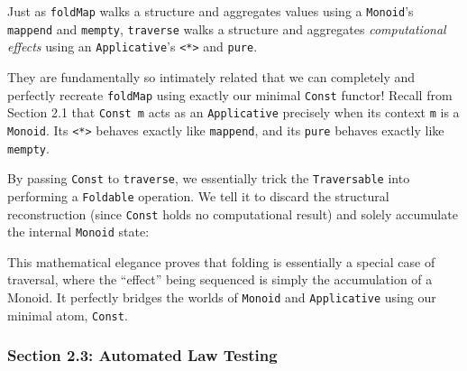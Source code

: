 \documentclass[
]{article}
\newenvironment{Shaded}{}{}
\newcommand{\CommentTok}[1]{\textcolor[rgb]{0.38,0.63,0.69}{\textit{#1}}}
\newcommand{\DataTypeTok}[1]{\textcolor[rgb]{0.56,0.13,0.00}{#1}}
\newcommand{\FunctionTok}[1]{\textcolor[rgb]{0.02,0.16,0.49}{#1}}
\newcommand{\KeywordTok}[1]{\textcolor[rgb]{0.00,0.44,0.13}{\textbf{#1}}}
\newcommand{\NormalTok}[1]{#1}
\newcommand{\OperatorTok}[1]{\textcolor[rgb]{0.40,0.40,0.40}{#1}}
\newcommand{\OtherTok}[1]{\textcolor[rgb]{0.00,0.44,0.13}{#1}}
\begin{document}
Just as \texttt{foldMap} walks a structure and aggregates values using a
\texttt{Monoid}'s \texttt{mappend} and \texttt{mempty},
\texttt{traverse} walks a structure and aggregates \emph{computational
effects} using an \texttt{Applicative}'s
\texttt{\textless{}*\textgreater{}} and \texttt{pure}.

They are fundamentally so intimately related that we can completely and
perfectly recreate \texttt{foldMap} using exactly our minimal
\texttt{Const} functor! Recall from Section 2.1 that \texttt{Const\ m}
acts as an \texttt{Applicative} precisely when its context \texttt{m} is
a \texttt{Monoid}. Its \texttt{\textless{}*\textgreater{}} behaves
exactly like \texttt{mappend}, and its \texttt{pure} behaves exactly
like \texttt{mempty}.

By passing \texttt{Const} to \texttt{traverse}, we essentially trick the
\texttt{Traversable} into performing a \texttt{Foldable} operation. We
tell it to discard the structural reconstruction (since \texttt{Const}
holds no computational result) and solely accumulate the internal
\texttt{Monoid} state:

\begin{Shaded}
\end{Shaded}

This mathematical elegance proves that folding is essentially a special
case of traversal, where the ``effect'' being sequenced is simply the
accumulation of a Monoid. It perfectly bridges the worlds of
\texttt{Monoid} and \texttt{Applicative} using our minimal atom,
\texttt{Const}.

\subsubsection{Section 2.3: Automated Law
Testing}\label{section-2.3-automated-law-testing}
\end{document}

